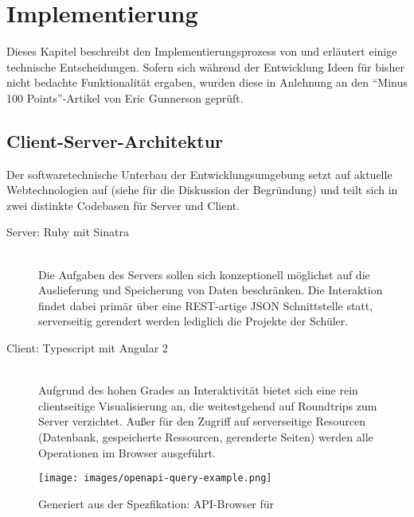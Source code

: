 \section{Implementierung}
\label{sec:implementation-analysis}

Dieses Kapitel beschreibt den Implementierungsprozess von \idename{} und erläutert einige technische Entscheidungen. Sofern sich während der Entwicklung Ideen für bisher nicht bedachte Funktionalität ergaben, wurden diese in Anlehnung an den "`Minus 100 Points"'-Artikel von Eric Gunnerson \cite{gunnerson-minus-100} geprüft.


\subsection{Client-Server-Architektur}
\label{sec:implementation-client-server}


Der softwaretechnische Unterbau der Entwicklungsumgebung setzt auf aktuelle Webtechnologien auf (siehe  für die Diskussion der Begründung) und teilt sich in zwei distinkte Codebasen für Server und Client.

\begin{description}
\item[Server: Ruby mit Sinatra] \hfill\\
  Die Aufgaben des Servers sollen sich konzeptionell möglichst auf die Auslieferung und Speicherung von Daten beschränken. Die Interaktion findet dabei primär über eine REST-artige JSON Schnittstelle statt, serverseitig gerendert werden lediglich die Projekte der Schüler.
\item[Client: Typescript mit Angular 2] \hfill\\
  Aufgrund des hohen Grades an Interaktivität bietet sich eine rein clientseitige Visualisierung an, die weitestgehend auf Roundtrips zum Server verzichtet. Außer für den Zugriff auf serverseitige Resourcen (Datenbank, gespeicherte Ressourcen, gerenderte Seiten) werden alle Operationen im Browser ausgeführt.
\end{description}

\begin{figure}[p]
  \centering \texttt{[image: images/openapi-query-example.png]}
  \caption{Generiert aus der Spezfikation: API-Browser für \idename{}}
  \label{fig:openapi-query-example}
\end{figure}

